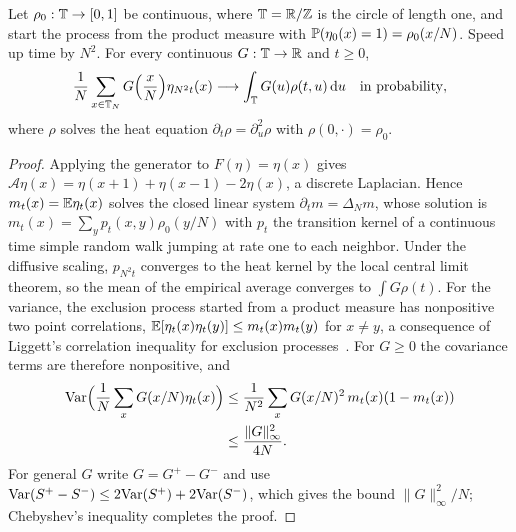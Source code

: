 \begin{theorem}
\label{thm:ssep}
Let $\rho_0:\T\to[0,1]$ be continuous, where $\T = \R/\Z$ is the circle of length one, and start the process from the product measure with $\P(\eta_0(x) = 1) = \rho_0(x/N)$. Speed up time by $N^2$. For every continuous $G:\T\to\R$ and $t\geq0$,
\[
\frac1N\sum_{x\in\T_N}G\Big(\frac xN\Big)\eta_{N^2t}(x)\longrightarrow\int_\T G(u)\rho(t,u)\dd u\quad\text{in probability},
\]
where $\rho$ solves the heat equation $\partial_t\rho = \partial_u^2\rho$ with $\rho(0,\cdot) = \rho_0$.
\end{theorem}

\begin{proof}
Applying the generator to $F(\eta) = \eta(x)$ gives $\mathcal{A}\eta(x) = \eta(x+1)+\eta(x-1)-2\eta(x)$, a discrete Laplacian. Hence $m_t(x) = \E\eta_t(x)$ solves the closed linear system $\partial_tm = \Delta_Nm$, whose solution is $m_t(x) = \sum_yp_t(x,y)\rho_0(y/N)$ with $p_t$ the transition kernel of a continuous time simple random walk jumping at rate one to each neighbor. Under the diffusive scaling, $p_{N^2t}$ converges to the heat kernel by the local central limit theorem, so the mean of the empirical average converges to $\int G\rho(t)$. For the variance, the exclusion process started from a product measure has nonpositive two point correlations, $\E[\eta_t(x)\eta_t(y)]\leq m_t(x)m_t(y)$ for $x\neq y$, a consequence of Liggett's correlation inequality for exclusion processes~\cite{liggett1985}. For $G\geq0$ the covariance terms are therefore nonpositive, and
\[
\begin{aligned}\Var\Big(\frac1N\sum_xG(x/N)\eta_t(x)\Big)&\leq\frac{1}{N^2}\sum_xG(x/N)^2\,m_t(x)(1-m_t(x))\\ &\leq\frac{\|G\|_\infty^2}{4N}.\end{aligned}
\]
For general $G$ write $G = G^+-G^-$ and use $\Var(S^+-S^-)\leq2\Var(S^+)+2\Var(S^-)$, which gives the bound $\|G\|_\infty^2/N$; Chebyshev's inequality completes the proof.
\end{proof}

